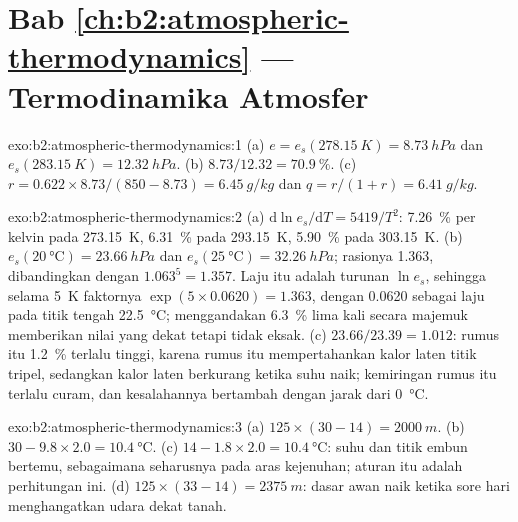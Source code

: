 \section*{Bab \ref{ch:b2:atmospheric-thermodynamics} --- Termodinamika Atmosfer}

\begin{solution}{exo:b2:atmospheric-thermodynamics:1}
(a) $e = e_s(\qty{278.15}{K}) = \qty{8.73}{hPa}$ dan $e_s(\qty{283.15}{K}) = \qty{12.32}{hPa}$.
(b) $8.73/12.32 = \qty{70.9}{\percent}$. (c) $r = 0.622 \times 8.73/(850 - 8.73) =
\qty{6.45}{g/kg}$ dan $q = r/(1 + r) = \qty{6.41}{g/kg}$.
\end{solution}

\begin{solution}{exo:b2:atmospheric-thermodynamics:2}
(a) $\mathrm{d}\ln e_s/\mathrm{d}T = 5419/T^2$: \qty{7.26}{\percent} per kelvin pada
\qty{273.15}{K}, \qty{6.31}{\percent} pada \qty{293.15}{K}, \qty{5.90}{\percent} pada
\qty{303.15}{K}. (b) $e_s(\qty{20}{\celsius}) = \qty{23.66}{hPa}$ dan $e_s(\qty{25}{\celsius})
= \qty{32.26}{hPa}$; rasionya 1.363, dibandingkan dengan $1.063^5 = 1.357$. Laju itu adalah turunan
$\ln e_s$, sehingga selama \qty{5}{K} faktornya $\exp(5 \times 0.0620) = 1.363$, dengan 0.0620 sebagai
laju pada titik tengah \qty{22.5}{\celsius}; menggandakan \qty{6.3}{\percent} lima kali secara majemuk memberikan nilai yang dekat
tetapi tidak eksak. (c) $23.66/23.39 = 1.012$: rumus itu \qty{1.2}{\percent} terlalu tinggi, karena
rumus itu mempertahankan kalor laten titik tripel, sedangkan kalor laten berkurang ketika suhu
naik; kemiringan rumus itu terlalu curam, dan kesalahannya bertambah dengan jarak dari
\qty{0}{\celsius}.
\end{solution}

\begin{solution}{exo:b2:atmospheric-thermodynamics:3}
(a) $125 \times (30 - 14) = \qty{2000}{m}$. (b) $30 - 9.8 \times 2.0 = \qty{10.4}{\celsius}$.
(c) $14 - 1.8 \times 2.0 = \qty{10.4}{\celsius}$: suhu dan titik embun bertemu, sebagaimana seharusnya pada
aras kejenuhan; aturan itu adalah perhitungan ini. (d) $125 \times (33 - 14) = \qty{2375}{m}$:
dasar awan naik ketika sore hari menghangatkan udara dekat tanah.
\end{solution}

